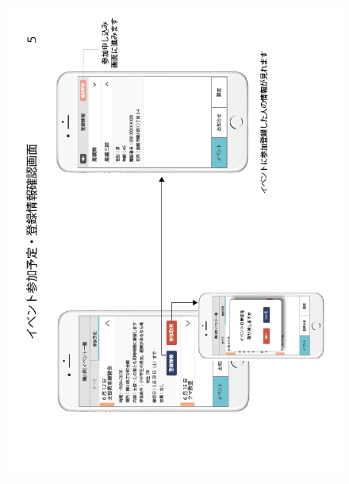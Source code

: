 \begin{figure}[ht]
    \begin{center}
      \includegraphics[keepaspectratio, scale=0.7]{appendixs/appendixB_figres/fig5.png}
    \end{center}
\end{figure}

